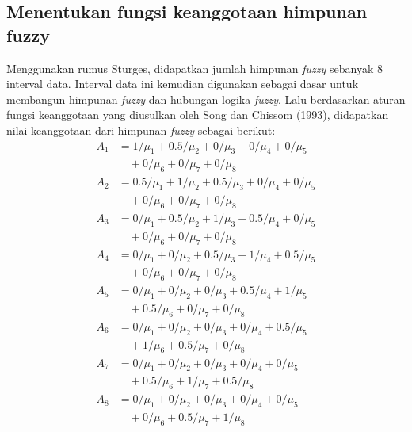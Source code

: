 \documentclass[conference]{IEEEtran}
\begin{document}
\subsection{Menentukan fungsi keanggotaan himpunan fuzzy}

Menggunakan rumus Sturges, didapatkan jumlah himpunan \textit{fuzzy} sebanyak 8 interval data. Interval data ini kemudian digunakan sebagai dasar untuk membangun himpunan \textit{fuzzy} dan hubungan logika \textit{fuzzy}. Lalu berdasarkan aturan fungsi keanggotaan yang diusulkan oleh Song dan Chissom (1993), didapatkan nilai keanggotaan dari himpunan \textit{fuzzy} sebagai berikut:
\begin{equation*}
    \label{eq:2}
    \begin{aligned}
        A_1 &= 1/{\mu_1} + 0.5/{\mu_2} + 0/{\mu_3} + 0/{\mu_4} + 0/{\mu_5} \\ 
            &\quad + 0/{\mu_6} + 0/{\mu_7} + 0/{\mu_8}\\
        A_2 &= 0.5/{\mu_1} + 1/{\mu_2} + 0.5/{\mu_3} + 0/{\mu_4} + 0/{\mu_5} \\ 
            &\quad + 0/{\mu_6} + 0/{\mu_7} + 0/{\mu_8}\\
        A_3 &= 0/{\mu_1} + 0.5/{\mu_2} + 1/{\mu_3} + 0.5/{\mu_4} + 0/{\mu_5} \\
            &\quad + 0/{\mu_6} + 0/{\mu_7} + 0/{\mu_8}\\
        A_4 &= 0/{\mu_1} + 0/{\mu_2} + 0.5/{\mu_3} + 1/{\mu_4} + 0.5/{\mu_5} \\
            &\quad + 0/{\mu_6} + 0/{\mu_7} + 0/{\mu_8}\\
        A_5 &= 0/{\mu_1} + 0/{\mu_2} + 0/{\mu_3} + 0.5/{\mu_4} + 1/{\mu_5} \\
            &\quad + 0.5/{\mu_6} + 0/{\mu_7} + 0/{\mu_8}\\
        A_6 &= 0/{\mu_1} + 0/{\mu_2} + 0/{\mu_3} + 0/{\mu_4} + 0.5/{\mu_5} \\
            &\quad + 1/{\mu_6} + 0.5/{\mu_7} + 0/{\mu_8}\\
        A_7 &= 0/{\mu_1} + 0/{\mu_2} + 0/{\mu_3} + 0/{\mu_4} + 0/{\mu_5} \\
            &\quad + 0.5/{\mu_6} + 1/{\mu_7} + 0.5/{\mu_8}\\
        A_8 &= 0/{\mu_1} + 0/{\mu_2} + 0/{\mu_3} + 0/{\mu_4} + 0/{\mu_5} \\
            &\quad + 0/{\mu_6} + 0.5/{\mu_7} + 1/{\mu_8}
    \end{aligned}
    \end{equation*}
\end{document}
